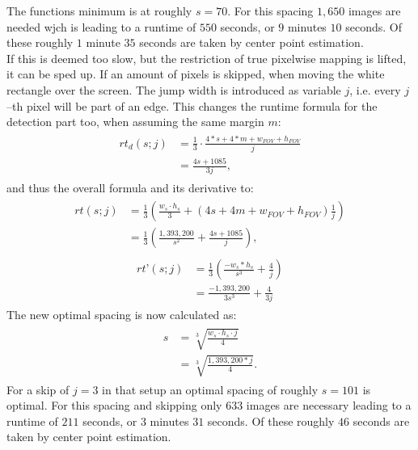 \documentclass[journal,final,a4paper,twoside]{PS}
\begin{document}
The functions minimum is at roughly $s = 70$. For this spacing $1,650$ images are needed wjch is leading to a runtime of $550$ seconds, or $9$ minutes $10$ seconds. Of these roughly $1$ minute $35$ seconds are taken by center point estimation.\\
If this is deemed too slow, but the restriction of true pixelwise mapping is lifted, it can be sped up. If an amount of pixels is skipped, when moving the white rectangle over the screen. The jump width is introduced as variable $j$, i.e. every $j$--th pixel will be part of an edge. This changes the runtime formula for the detection part too, when assuming the same margin $m$:
\begin{align}\begin{split}
rt_d (s; j) &=\frac{1}{3} \cdot \frac{4*s + 4 * m + w_{FOV} + h_{FOV}}{j}\\
 &= \frac{4s + 1085}{3j},\end{split}
\end{align}
and thus the overall formula and its derivative to:
\begin{align}\begin{split}
rt(s; j) &= \frac{1}{3} \left(\frac{w_s\cdot h_s}{3} + \left( 4s + 4m + w_{FOV} + h_{FOV}\right)\frac{1}{j}\right)\\ &=\frac{1}{3}\left( \frac{1,393,200}{s^2} + \frac{4s +1085}{j}\right),\end{split}
\end{align}
\begin{align}\begin{split}
rt’(s; j) &= \frac{1}{3} \left(\frac{-w_s * h_s}{s^3} + \frac{4}{j}\right)\\& =\frac{-1,393,200 }{3s^3} + \frac{4}{3j} \end{split}
\end{align}
The new optimal spacing is now calculated as:
\begin{align}\begin{split}
s &= \sqrt[3]{\frac{w_s \cdot h_s \cdot j }{ 4}} \\&= \sqrt[3]{\frac{1,393,200 * j} { 4}}.\end{split}
\end{align}
For a skip of $j = 3$ in that setup an optimal spacing of roughly $s = 101$ is optimal. For this spacing and skipping only $633$ images are necessary leading to a runtime of $211$ seconds, or $3$ minutes $31$ seconds. Of these roughly $46$ seconds are taken by center point estimation.
\end{document}
